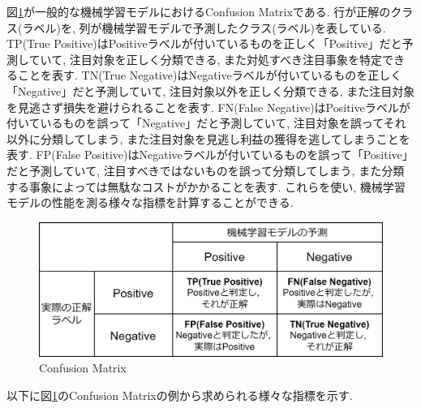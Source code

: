 \documentclass{ltjarticle}
\begin{document}
図\ref{fig:Confusion Matrix}が一般的な機械学習モデルにおけるConfusion Matrixである. 行が正解のクラス(ラベル)を, 列が機械学習モデルで予測したクラス(ラベル)を表している. 
TP(True Positive)はPositiveラベルが付いているものを正しく「Positive」だと予測していて, 注目対象を正しく分類できる, また対処すべき注目事象を特定できることを表す. 
TN(True Negative)はNegativeラベルが付いているものを正しく「Negative」だと予測していて, 注目対象以外を正しく分類できる, また注目対象を見逃さず損失を避けられることを表す. 
FN(False Negative)はPositiveラベルが付いているものを誤って「Negative」だと予測していて, 注目対象を誤ってそれ以外に分類してしまう, また注目対象を見逃し利益の獲得を逃してしまうことを表す. 
FP(False Positive)はNegativeラベルが付いているものを誤って「Positive」だと予測していて, 注目すべきではないものを誤って分類してしまう, また分類する事象によっては無駄なコストがかかることを表す. 
これらを使い, 機械学習モデルの性能を測る様々な指標を計算することができる. 
\vspace{10truept}

\begin{figure}[h]
    \centering
    \includegraphics[width = 12cm]{images/Confusion_Matrix.drawio.png}
    \caption{Confusion Matrix}
    \label{fig:Confusion Matrix}
\end{figure}
\vspace{5truept}

\noindent
以下に図\ref{fig:Confusion Matrix}のConfusion Matrixの例から求められる様々な指標を示す. 
\vspace{10truept}
\end{document}
